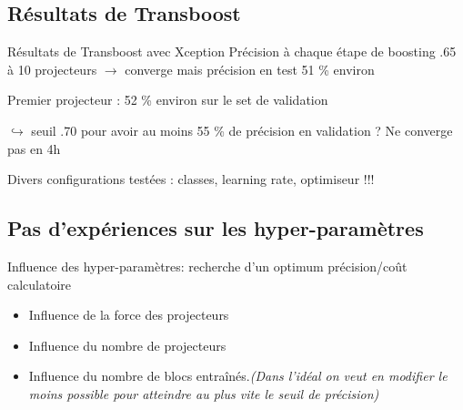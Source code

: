 \documentclass{beamer}
\begin{document}
    \subsection{Résultats de Transboost}
    	\begin{frame}

\begin{block}{Résultats de Transboost avec Xception}
Précision à chaque étape  de boosting .65 à 10 projecteurs $\rightarrow$ converge mais précision en test 51 \% environ

\bigskip

Premier projecteur : 52 \% environ sur le set de validation

\end{block}

\bigskip

$\hookrightarrow$ seuil .70 pour avoir au moins 55 \% de précision en validation ? Ne converge pas en 4h

\medskip

Divers configurations testées : classes, learning rate, optimiseur !!!

    	\end{frame}
    \subsection{Pas d’expériences sur les hyper-paramètres}
		\begin{frame}
        Influence des hyper-paramètres: recherche d'un optimum précision/coût calculatoire
        \begin{itemize}
        \item Influence de la force des projecteurs
        \item Influence du nombre de projecteurs
        \item Influence du nombre de blocs entraînés.\emph{(Dans l’idéal on veut en modifier le moins possible pour atteindre au plus vite le seuil de précision)}
        \end{itemize}
			
		\end{frame}
       
\end{document}
